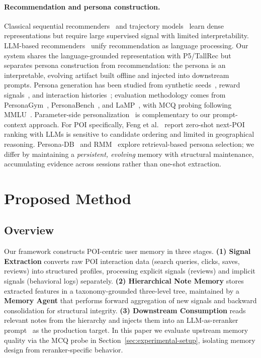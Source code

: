 \documentclass[sigconf,review,anonymous]{acmart}
\begin{document}
\paragraph{Recommendation and persona construction.}
Classical sequential recommenders~\cite{sasrec,bert4rec} and trajectory models~\cite{deepmove,stan,getnext} learn dense representations but require large supervised signal with limited interpretability. LLM-based recommenders~\cite{p5,tallrec,llara,recmind,llm4rec-survey} unify recommendation as language processing. Our system shares the language-grounded representation with P5/TallRec but separates persona construction from recommendation: the persona is an interpretable, evolving artifact built offline and injected into downstream prompts. Persona generation has been studied from synthetic seeds~\cite{personahub}, reward signals~\cite{synthesizeme}, and interaction histories~\cite{proex}; evaluation methodology comes from PersonaGym~\cite{personagym}, PersonaBench~\cite{personabench}, and LaMP~\cite{lamp}, with MCQ probing following MMLU~\cite{mmlu}. Parameter-side personalization~\cite{oppu,hydra} is complementary to our prompt-context approach. For POI specifically, Feng et al.~\cite{zeropoirec} report zero-shot next-POI ranking with LLMs is sensitive to candidate ordering and limited in geographical reasoning. Persona-DB~\cite{persona-db} and RMM~\cite{rmm} explore retrieval-based persona selection; we differ by maintaining a \textit{persistent, evolving} memory with structural maintenance, accumulating evidence across sessions rather than one-shot extraction.


\section{Proposed Method}

\subsection{Overview}

Our framework constructs POI-centric user memory in three stages. \textbf{(1) Signal Extraction} converts raw POI interaction data (search queries, clicks, saves, reviews) into structured profiles, processing explicit signals (reviews) and implicit signals (behavioral logs) separately. \textbf{(2) Hierarchical Note Memory} stores extracted features in a taxonomy-grounded three-level tree, maintained by a \textbf{Memory Agent} that performs forward aggregation of new signals and backward consolidation for structural integrity. \textbf{(3) Downstream Consumption} reads relevant notes from the hierarchy and injects them into an LLM-as-reranker prompt~\cite{rankgpt} as the production target. In this paper we evaluate upstream memory quality via the MCQ probe in Section~\ref{sec:experimental-setup}, isolating memory design from reranker-specific behavior.
\end{document}
